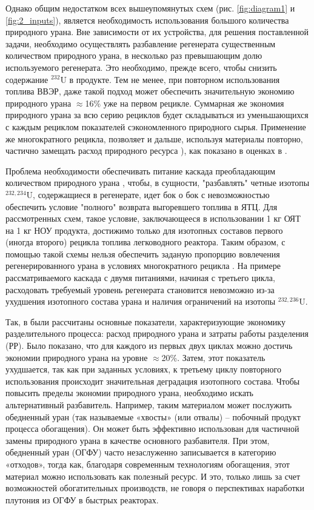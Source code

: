 Однако общим недостатком всех вышеупомянутых схем (рис. \ref{fig:diagram1} и \ref{fig:2_inputs}), является необходимость использования большого количества природного урана.
Вне зависимости от их устройства, для решения поставленной задачи, необходимо осуществлять разбавление регенерата существенным количеством природного урана, в несколько раз превышающим долю используемого регенерата. Это необходимо, прежде всего, чтобы снизить содержание $^{232}$U в продукте.
Тем не менее, при повторном использования топлива ВВЭР, даже такой подход может обеспечить значительную экономию природного урана $\approx$16\% уже на первом рецикле.
Суммарная же экономия природного урана за всю серию рециклов будет складываться из уменьшающихся с каждым рециклом показателей сэкономленного природного сырья. 
Применение же многократного рецикла, позволяет и дальше, используя материалы повторно, частично замещать расход природного ресурса \cite{colemanEvaluationMultipleSelfrecycling2010}), как показано в оценках в \cite{smirnovEvolutionIsotopicComposition2012}.

Проблема необходимости обеспечивать питание каскада преобладающим количеством природного урана , чтобы, в сущности, "разбавлять" четные изотопы  $^{232,234}$U, содержащиеся в регенерате, идет бок о бок с невозможностью обеспечить условие "полного" возврата выгоревшего топлива в ЯТЦ.
Для рассмотренных схем, такое условие, заключающееся в использовании 1 кг ОЯТ на 1 кг НОУ продукта, достижимо только для изотопных составов первого (иногда второго) рецикла топлива легководного реактора.
Таким образом, с помощью такой схемы нельзя обеспечить заданую пропорцию вовлечения регенерированного урана в условиях многократного рецикла \cite{smirnovApplyingEnrichmentCapacities2018}.
На примере рассматриваемого каскада с двумя питаниями, начиная с третьего цикла, расходовать требуемый уровень регенерата становится невозможно из-за ухудшения изотопного состава урана и наличия ограничений на изотопы $^{232,236}$U.

Так, в \cite{smirnovApplyingEnrichmentCapacities2018} были рассчитаны основные показатели, характеризующие экономику разделительного процесса: расход природного урана и затраты работы разделения (РР).
Было показано, что для каждого из первых двух циклах можно достичь экономии природного урана на уровне $\approx$20\%. Затем, этот показатель ухудшается, так как при заданных условиях, к третьему циклу повторного использования происходит значительная деградация изотопного состава.
Чтобы повысить пределы экономии природного урана, необходимо искать альтернативный разбавитель. Например, таким материалом может послужить обедненный уран (так называемые «хвосты» (или отвалы) -- побочный продукт процесса обогащения).
Он может быть эффективно использован для частичной замены природного урана в качестве основного разбавителя.
При этом, обедненный уран (ОГФУ) часто незаслуженно записывается в категорию «отходов», тогда как, благодаря современным технологиям обогащения, этот материал можно использовать как полезный ресурс.
И это, только лишь за счет возможностей обогатительных производств, не говоря о перспективах наработки плутония из ОГФУ в быстрых реакторах.

